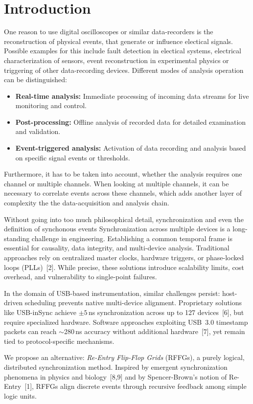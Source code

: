 \documentclass[11pt]{article}
\begin{document}
\section{Introduction}
One reason to use digital oscilloscopes or similar data-recorders is the reconstruction of physical events, that generate or influence electical signals.
Possible examples for this include fault detection in electical systems, electrical characterization of sensors, event reconstruction in experimental physics or triggering of other data-recording devices.
Different modes of analysis operation can be distinguished:
\begin{itemize}
    \item \textbf{Real-time analysis:} Immediate processing of incoming data streams for live monitoring and control.
    \item \textbf{Post-processing:} Offline analysis of recorded data for detailed examination and validation.
    \item \textbf{Event-triggered analysis:} Activation of data recording and analysis based on specific signal events or thresholds.
\end{itemize}
Furthermore, it has to be taken into account, whether the analysis requires one channel or multiple channels.
When looking at multiple channels, it can be necessary to correlate events across these channels, which adds another layer of complexity the the data-acquisition and analysis chain.

Without going into too much philosophical detail, synchronization and even the definition of synchonous events 
Synchronization across multiple devices is a long-standing challenge in engineering. Establishing a common temporal frame is essential for causality, data integrity, and multi-device analysis. Traditional approaches rely on centralized master clocks, hardware triggers, or phase-locked loops (PLLs)~[2]. While precise, these solutions introduce scalability limits, cost overhead, and vulnerability to single-point failures.

In the domain of USB-based instrumentation, similar challenges persist: host-driven scheduling prevents native multi-device alignment. Proprietary solutions like USB-inSync achieve $\pm 5$\,ns synchronization across up to 127 devices~[6], but require specialized hardware. Software approaches exploiting USB~3.0 timestamp packets can reach $\sim$280\,ns accuracy without additional hardware~[7], yet remain tied to protocol-specific mechanisms.

We propose an alternative: \textit{Re-Entry Flip-Flop Grids} (RFFGs), a purely logical, distributed synchronization method. Inspired by emergent synchronization phenomena in physics and biology~[8,9] and by Spencer-Brown’s notion of Re-Entry~[1], RFFGs align discrete events through recursive feedback among simple logic units.
\end{document}
